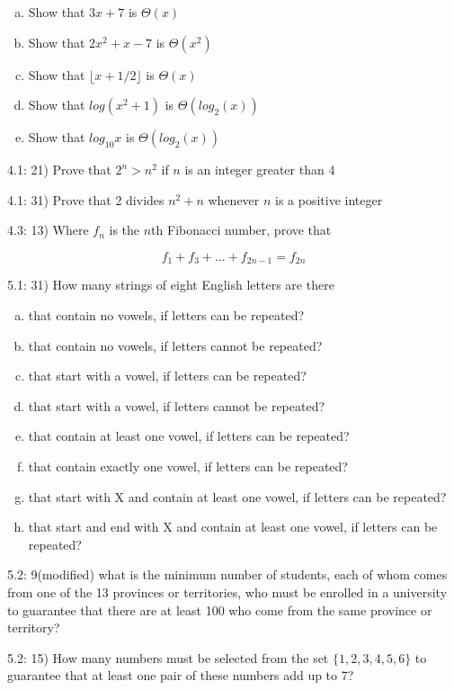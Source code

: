 \documentclass{report}
\begin{document}
\begin{enumerate}[a)]
\item Show that $3x + 7$ is $\Theta (x)$
\item Show that $2x^2+x-7$ is $\Theta (x^2)$
\item Show that $\lfloor x + 1/2 \rfloor$ is $\Theta (x)$
\item Show that $log(x^2+1)$ is $\Theta (log_2(x))$
\item Show that $log_{10}x$ is $\Theta (log_2(x))$
\end{enumerate}

4.1: 21) Prove that $2^n > n^2$ if $n$ is an integer greater than 4

4.1: 31) Prove that 2 divides $n^2 + n$ whenever $n$ is a positive integer

4.3: 13) Where $f_n$ is the $n$th Fibonacci number, prove that

\[
f_1 + f_3 + ... + f_{2n-1} = f_{2n}
\]

5.1: 31) How many strings of eight English letters are there

\begin{enumerate}[a)]
\item that contain no vowels, if letters can be repeated?
\item that contain no vowels, if letters cannot be repeated?
\item that start with a vowel, if letters can be repeated?
\item that start with a vowel, if letters cannot be repeated?
\item that contain at least one vowel, if letters can be repeated?
\item that contain exactly one vowel, if letters can be repeated?
\item that start with X and contain at least one vowel, if letters can be repeated?
\item that start and end with X and contain at least one vowel, if
  letters can be repeated?
\end{enumerate}

5.2: 9(modified) what is the minimum number of students, each of whom
comes from one of the 13 provinces or territories, who must be
enrolled in a university to guarantee that there are at least 100 who
come from the same province or territory?

5.2: 15) How many numbers must be selected from the set
$\{1,2,3,4,5,6\}$ to guarantee that at least one pair of these numbers
add up to 7?
\end{document}
